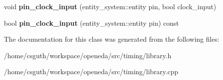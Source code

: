 \begin{DoxyCompactItemize}
\item 
\hypertarget{classophidian_1_1timing_1_1library_ae7d154f9a17f269876763cf63bee66f3}{void {\bfseries pin\-\_\-clock\-\_\-input} (entity\-\_\-system\-::entity pin, bool clock\-\_\-input)}\label{classophidian_1_1timing_1_1library_ae7d154f9a17f269876763cf63bee66f3}

\item 
\hypertarget{classophidian_1_1timing_1_1library_a388a02d9ca83f843b1266f3422923554}{bool {\bfseries pin\-\_\-clock\-\_\-input} (entity\-\_\-system\-::entity pin) const }\label{classophidian_1_1timing_1_1library_a388a02d9ca83f843b1266f3422923554}

\end{DoxyCompactItemize}


The documentation for this class was generated from the following files\-:\begin{DoxyCompactItemize}
\item 
/home/csguth/workspace/openeda/src/timing/library.\-h\item 
/home/csguth/workspace/openeda/src/timing/library.\-cpp\end{DoxyCompactItemize}
